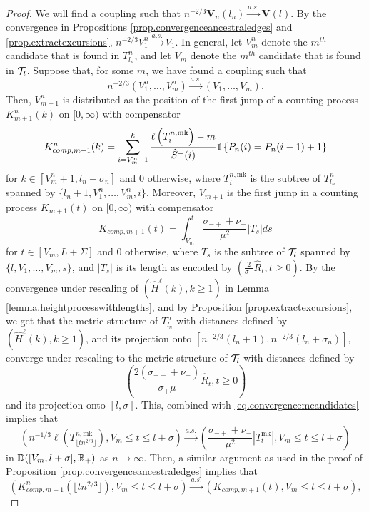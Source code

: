 \begin{proof}
We will find a coupling such that $n^{-2/3}\mathbf{V}_n(l_n)\overset{a.s.}{\to}\mathbf{V}(l).$ By the convergence in Propositions \ref{prop.convergenceancestraledges} and \ref{prop.extractexcursions}, $n^{-2/3}V_1^n\overset{a.s.}{\to}V_1$. In general, let $V_m^n$ denote the $m^{th}$ candidate that is found in $T^n_{l_n}$, and let $V_m$ denote the $m^{th}$ candidate that is found in ${\mathcal T}_l$. Suppose that, for some $m$, we have found a coupling such that 
\begin{equation}\label{eq.convergencemcandidates}n^{-2/3}(V_1^n,\dots,V_m^n)\overset{a.s.}{\to}(V_1,\dots,V_m).\end{equation}
Then, $V_{m+1}^n$ is distributed as the position of the first jump of a counting process $K^n_{m+1}(k)$ on $[0,\infty)$ with compensator 
$$K^n_{comp,m+1}(k)=\sum_{i=V_m^n+1}^k \frac{\ell\left(T^{n,\text{mk}}_{i}\right)-m}{\hat{S}^-(i)}  \one{\left\{P_n(i)=P_n(i-1)+1\right\}}$$
for $k\in [V_m^n+1,l_n+\sigma_n]$ and $0$ otherwise, where $T^{n,\text{mk}}_{i}$ is the subtree of $T^n_{l_n}$ spanned by $\{l_n+1,V^n_1,\dots,V^n_m,i\}$. 
Moreover, $V_{m+1}$ is the first jump in a counting process $K_{m+1}(t)$ on $[0,\infty)$ with compensator 
$$K_{comp,m+1}(t)= \int_{V_m}^t\frac{\sigma_{-+}+\nu_-}{\mu^2}|T_s|ds$$
for $t\in [V_m,L+\Sigma]$ and $0$ otherwise, where $T_s$ is the subtree of ${\mathcal T}_l$ spanned by $\{l,V_1,\dots,V_m, s\}$, and $|T_s|$ is its length as encoded by $\left(\frac{2}{\sigma_+}\hat{R}_t,t\geq 0\right)$. By the convergence under rescaling of $(\hat{H}^\ell(k),k\geq 1)$ in Lemma \ref{lemma.heightprocesswithlengths}, and by Proposition \ref{prop.extractexcursions}, we get that the metric structure of $T^n_{l_n}$ with distances defined by $(\hat{H}^\ell(k),k\geq 1)$, and its projection onto $[n^{-2/3}(l_n+1),n^{-2/3}(l_n+\sigma_n)]$, converge under rescaling to the metric structure of ${\mathcal T}_l$ with distances defined by $$\left(\frac{2(\sigma_{-+}+\nu_-)}{\sigma_+\mu}\hat{R}_t,t\geq 0\right)$$ and its projection onto $[l,\sigma]$. This, combined with \eqref{eq.convergencemcandidates} implies that 
$$\left(n^{-1/3}\ell\left(T^{n,\text{mk}}_{\lfloor t n^{2/3}\rfloor}\right),V_m\leq t \leq l+\sigma\right)\overset{a.s.}{\to} \left(\frac{\sigma_{-+}+\nu_-}{\mu^2}|T^{\text{mk}}_t|, V_m\leq t \leq l+\sigma\right)$$ in ${\mathbb D}([V_m,l+\sigma],{\mathbb R}_+)$ as $n\to \infty$. Then, a similar argument as used in the proof of Proposition \ref{prop.convergenceancestraledges} implies that 
$$\left(K^n_{comp,m+1}\left(\lfloor t n^{2/3}\rfloor \right),V_m\leq t \leq l+\sigma\right)\overset{a.s.}{\to}\left(K_{comp,m+1}(t),V_m\leq t \leq l+\sigma\right),$$

\end{proof}
